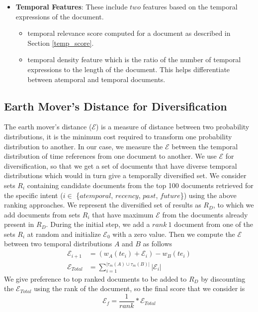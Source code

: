 \documentclass{sig-alternate}
\begin{document}
\begin{itemize}
\item\textbf{Temporal Features}: These include $two$ features based on the temporal expressions of the document.
       \begin{itemize}
       \item \textsf{temporal relevance score} computed for a document as described in Section \ref{temp_score}.
       \item \textsf{temporal density feature} which is the ratio of the number of temporal expressions to the length of the document. This helps differentiate between atemporal and temporal documents. 
       \end{itemize}
\end{itemize}
\subsection{Earth Mover's Distance for Diversification}\label{diversification}
The earth mover's distance ($\mathcal E$) is a measure of distance between two probability distributions, it is the minimum cost required to transform one probability distribution to another. In our case, we measure the $\mathcal E$ between the temporal distribution of time references from one document to another.  We use $\mathcal E$ for diversification, so that we get a set of documents that have diverse temporal distributions which would in turn give a temporally diversified set. We consider sets $R_{i}$ containing candidate documents from the top 100 documents retrieved for the specific intent ($i \in$ \{$atemporal$, $recency$, $past$, $future$\}) using the above ranking approaches. We represent the diversified set of results as $R_{D}$, to which we add documents from sets $R_{i}$ that have maximum $\mathcal E$ from the documents already present in $R_{D}$. During the initial step, we add a $rank\ 1$ document from one of the sets $R_{i}$ at random and initialize $\mathcal E_{0}$ with a zero value. Then we compute the $\mathcal E$ between two temporal distributions $A$ and $B$ as follows
\begin{equation}\label{eq:8}
	\begin{aligned}
		\mathcal E_{i+1} &= (w_{A}(te_{i}) + \mathcal E_{i}) - w_{B}(te_{i}) \\
		\mathcal E_{Total} &= \sum\limits_{i=1}^{|\tau_{m}(A) \cup \tau_{m}(B)|}|\mathcal E_{i}|
	\end{aligned}
\end{equation}
We give preference to top ranked documents to be added to $R_{D}$ by discounting the $\mathcal E_{Total}$ using the rank of the document, so the final score that we consider is
\begin{equation}\label{eq:9}
       \mathcal E_{f} = \frac{1}{rank} * \mathcal E_{Total}
\end{equation}
\end{document}
